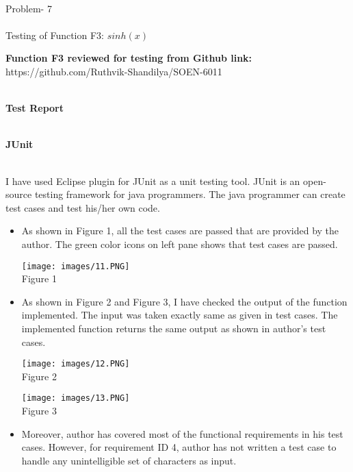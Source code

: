 \documentclass[10pt,letterpaper]{article}
\begin{document}
\begin{large}
\begin{center}
\\\Large Problem- 7\\
\\\Large Testing of Function F3: $sinh(x)$
\end{center}
\end{large}
\textbf{Function F3 reviewed for testing from Github link:} https://github.com/Ruthvik-Shandilya/SOEN-6011 
\begin{large}
\begin{center}
\\\Large \textbf{Test Report}\\
\end{center}
\end{large}
\begin{large}
\\\Large \textbf{JUnit}\\\\
\end{large}
I have used Eclipse plugin for JUnit as a unit testing tool. JUnit is an open-source testing framework for java programmers. The java programmer can create test cases and test his/her own code.
\begin{itemize}
    \item As shown in Figure 1, all the test cases are passed that are provided by the author. The green color icons on left pane shows that test cases are passed.
\begin{center}
    \texttt{[image: images/11.PNG]}\\
  \caption{Figure 1}
\end{center}
\newpage
    \item As shown in Figure 2 and Figure 3, I have checked the output of the function implemented. The input was taken exactly same as given in test cases. The implemented function returns the same output as shown in author's test cases.
    \begin{center}
    \texttt{[image: images/12.PNG]}\\
  \caption{Figure 2}
\end{center}
\begin{center}
    \texttt{[image: images/13.PNG]}\\
  \caption{Figure 3}
\end{center}
\item Moreover, author has covered most of the functional requirements in his test cases. However, for requirement ID 4, author has not written a test case to handle any unintelligible set of characters as input. 
\end{itemize}
\end{document}
